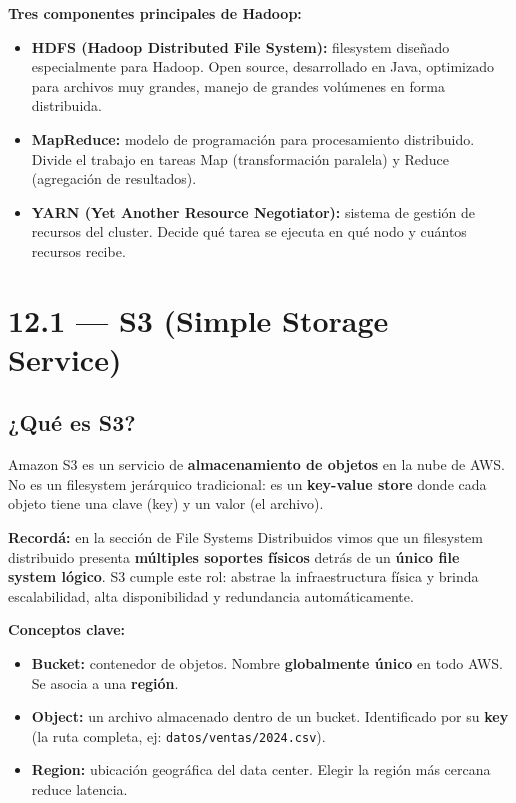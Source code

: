 \documentclass[11pt, a4paper]{article}
\begin{document}
\textbf{Tres componentes principales de Hadoop:}
\begin{itemize}
	\item \textbf{HDFS (Hadoop Distributed File System):} filesystem diseñado especialmente para Hadoop. Open source, desarrollado en Java, optimizado para archivos muy grandes, manejo de grandes volúmenes en forma distribuida.
	\item \textbf{MapReduce:} modelo de programación para procesamiento distribuido. Divide el trabajo en tareas Map (transformación paralela) y Reduce (agregación de resultados).
	\item \textbf{YARN (Yet Another Resource Negotiator):} sistema de gestión de recursos del cluster. Decide qué tarea se ejecuta en qué nodo y cuántos recursos recibe.
\end{itemize}

\section{12.1 — S3 (Simple Storage Service)}

\subsection{¿Qué es S3?}

Amazon S3 es un servicio de \textbf{almacenamiento de objetos} en la nube de AWS. No es un filesystem jerárquico tradicional: es un \textbf{key-value store} donde cada objeto tiene una clave (key) y un valor (el archivo).

\begin{recallbox}
	\textbf{Recordá:} en la sección de File Systems Distribuidos vimos que un filesystem distribuido presenta \textbf{múltiples soportes físicos} detrás de un \textbf{único file system lógico}. S3 cumple este rol: abstrae la infraestructura física y brinda escalabilidad, alta disponibilidad y redundancia automáticamente.
\end{recallbox}

\textbf{Conceptos clave:}
\begin{itemize}
	\item \textbf{Bucket:} contenedor de objetos. Nombre \textbf{globalmente único} en todo AWS. Se asocia a una \textbf{región}.
	\item \textbf{Object:} un archivo almacenado dentro de un bucket. Identificado por su \textbf{key} (la ruta completa, ej: \texttt{datos/ventas/2024.csv}).
	\item \textbf{Region:} ubicación geográfica del data center. Elegir la región más cercana reduce latencia.
\end{itemize}
\end{document}
